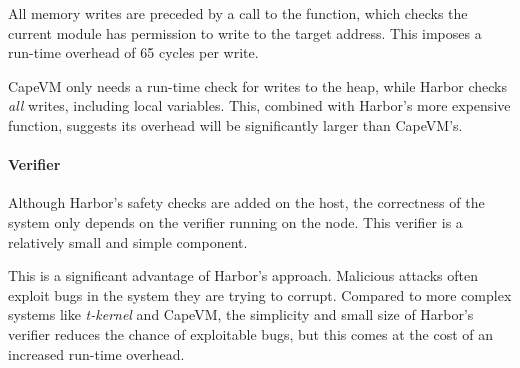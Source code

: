 All memory writes are preceded by a call to the  function, which checks the current module has permission to write to the target address. This imposes a run-time overhead of 65 cycles per write.

CapeVM only needs a run-time check for writes to the heap, while Harbor checks \emph{all} writes, including local variables. This, combined with Harbor's more expensive  function, suggests its overhead will be significantly larger than CapeVM's.

\paragraph{Verifier}
Although Harbor's safety checks are added on the host, the correctness of the system only depends on the verifier running on the node. This verifier is a relatively small and simple component.

This is a significant advantage of Harbor's approach. Malicious attacks often exploit bugs in the system they are trying to corrupt. Compared to more complex systems like \emph{t-kernel} and CapeVM, the simplicity and small size of Harbor's verifier reduces the chance of exploitable bugs, but this comes at the cost of an increased run-time overhead.

